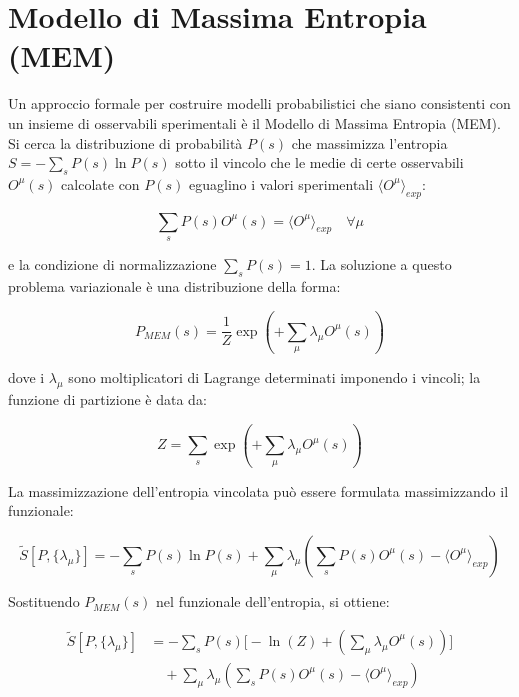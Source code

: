 \section{Modello di Massima Entropia (MEM)}
Un approccio formale per costruire modelli probabilistici che siano consistenti con un insieme di osservabili sperimentali è il Modello di Massima Entropia (MEM). Si cerca la distribuzione di probabilità $P(s)$ che massimizza l'entropia $S = -\sum_s P(s) \ln P(s)$ sotto il vincolo che le medie di certe osservabili $O^\mu(s)$ calcolate con $P(s)$ eguaglino i valori sperimentali $\langle O^\mu \rangle_{exp}$:

\begin{equation} \label{eq:ch24_10}
\sum_s P(s) O^\mu(s) = \langle O^\mu \rangle_{exp} \quad \forall \mu
\end{equation}

e la condizione di normalizzazione $\sum_s P(s) = 1$.
La soluzione a questo problema variazionale è una distribuzione della forma:

\begin{equation} \label{eq:ch24_11}
P_{MEM}(s) = \frac{1}{Z} \exp\left(+\sum_\mu \lambda_\mu O^\mu(s)\right)
\end{equation}

dove i $\lambda_\mu$ sono moltiplicatori di Lagrange determinati imponendo i vincoli; la funzione di partizione è data da:

\begin{equation} \label{eq:ch24_12}
Z = \sum_s \exp\left(+\sum_\mu \lambda_\mu O^\mu(s)\right)  
\end{equation}

La massimizzazione dell'entropia vincolata può essere formulata massimizzando il funzionale:

\begin{equation} \label{eq:ch24_13}
\tilde{S}[P, \{\lambda_\mu\}] = -\sum_s P(s) \ln P(s) + \sum_\mu \lambda_\mu \left( \sum_s P(s) O^\mu(s) - \langle O^\mu \rangle_{exp} \right)
\end{equation}

Sostituendo $P_{MEM}(s)$ nel funzionale dell'entropia, si ottiene:

\begin{align} 
\tilde{S}[P, \{\lambda_\mu\}] &= -\sum_s P(s) \Biggl[ -\ln(Z) + \left(\sum_\mu \lambda_\mu O^\mu(s)\right)\Biggr] \nonumber \\
&\quad + \sum_\mu \lambda_\mu \left( \sum_s P(s) O^\mu(s) - \langle O^\mu \rangle_{exp} \right) \label{eq:ch24_14}
\end{align}

